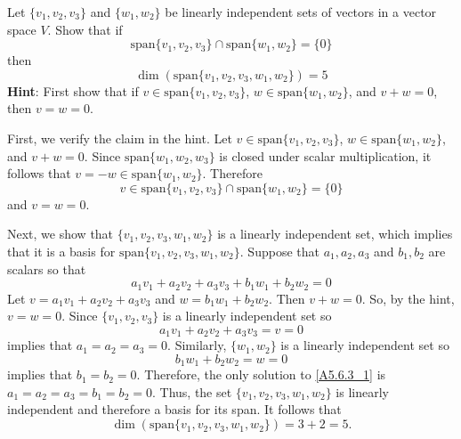 \documentclass{ximera}
\begin{document}
\begin{exercise} \label{A5.6.3}
Let $\{v_1,v_2,v_3\}$ and $\{w_1,w_2\}$ be linearly independent sets of vectors in a vector space $V$. Show that if
\[
\text{span}\{v_1,v_2,v_3\} \cap \text{span}\{w_1,w_2\}=\{0\}
\]
then 
\[
\dim(\text{span}\{v_1,v_2,v_3,w_1,w_2\}) = 5
\]
{\bf Hint}: First show that if $v\in \text{span}\{v_1,v_2,v_3\}$, $w\in \text{span}\{w_1,w_2\}$, and $v+w=0$, then $v=w=0$. 


\begin{solution} 
\soln First, we verify the claim in the hint. Let $v\in \text{span}\{v_1,v_2,v_3\}$, $w\in \text{span}\{w_1,w_2\}$, and $v+w=0$. Since $\text{span}\{w_1,w_2,w_3\}$ is closed under scalar multiplication, it follows that $ v= -w \in  \text{span}\{w_1,w_2\}$. Therefore
\[
v\in \text{span}\{v_1,v_2,v_3\} \cap \text{span}\{w_1,w_2\} = \{0\}
\]
and $v = w = 0$.

Next, we show that $\{v_1,v_2,v_3,w_1,w_2 \}$ is a linearly independent set, which implies that it is a basis for $\text{span}\{v_1,v_2,v_3, w_1, w_2\}$.  Suppose that $a_1,a_2, a_3$ and $b_1, b_2$ are scalars so that
\begin{equation} \label{A5.6.3_1}
a_1 v_1 + a_2 v_2 + a_3 v_3 + b_1 w_1 + b_2 w_2 = 0
\end{equation}
Let $v = a_1 v_1 + a_2 v_2 + a_3 v_3$ and $w = b_1 w_1 + b_2 w_2$.  Then $v + w = 0$. So, by the hint, $v = w = 0$.  Since $\{v_1,v_2,v_3\}$ is a linearly independent set so
\[
a_1 v_1 + a_2 v_2 + a_3 v_3 = v =0
\]
implies that $a_1 = a_2 = a_3 = 0$.  Similarly, $\{w_1, w_2\}$ is a linearly independent set so
\[
b_1 w_1 + b_2 w_2 = w = 0
\]
implies that $b_1 = b_2 = 0$.  Therefore, the only solution to \eqref{A5.6.3_1} is 
$a_1 = a_2 = a_3 = b_1 = b_2 = 0$.  Thus, the set $\{v_1,v_2,v_3,w_1,w_2\}$ is linearly independent and therefore a basis for its span.  It follows that
\[
\dim(\text{span}\{v_1,v_2,v_3,w_1,w_2\}) = 3 + 2 = 5.
\]
\end{solution}
\end{exercise}
\end{document}
